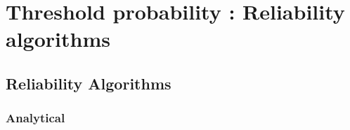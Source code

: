 \newpage
{}
\section{Threshold  probability : Reliability algorithms}



\subsection{Reliability Algorithms}

\subsubsection{Analytical}

